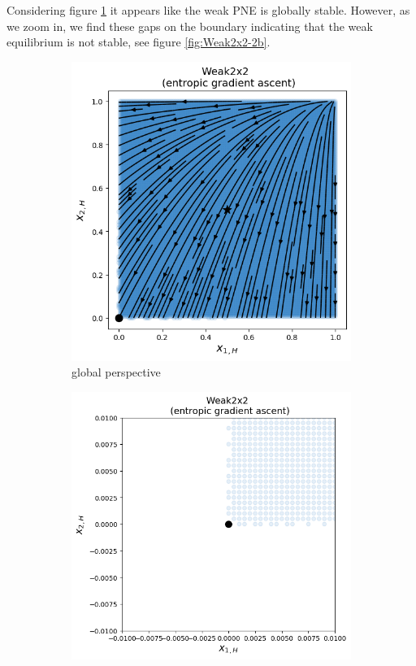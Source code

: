 Considering figure \ref{fig:Weak2x2-2a} it appears like the weak PNE is globally stable. However, as we zoom in, we find these gaps on the boundary indicating that the weak equilibrium is not stable, see figure \ref{fig:Weak2x2-2b}.

\begin{figure}[H]
\captionsetup{justification=centering}
\centering
\begin{subfigure}{.47\textwidth}
    \centering
    \includegraphics[width=\textwidth]{logos/Weak2x2-3.png}
    \caption{global perspective}
    \label{fig:Weak2x2-2a}
\end{subfigure}%
\begin{subfigure}{.53\textwidth}
    \centering
    \includegraphics[width=\textwidth]{logos/Weak2x2-6.png}

\end{subfigure}
\end{figure}
